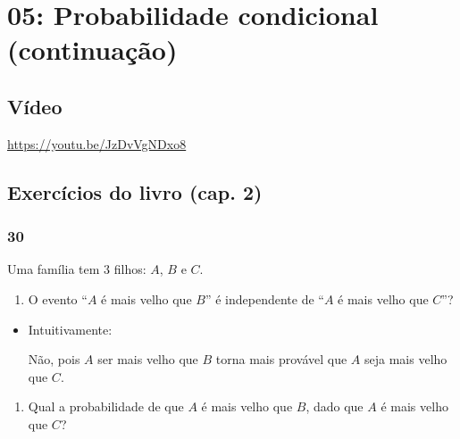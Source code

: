 \documentclass[
  11pt]{report}
\providecommand{\tightlist}{%
  \setlength{\itemsep}{0pt}\setlength{\parskip}{0pt}}
\begin{document}
\hypertarget{probabilidade-condicional-continuauxe7uxe3o}{%
\chapter*{05: Probabilidade condicional (continuação)}\label{probabilidade-condicional-continuauxe7uxe3o}}

\hypertarget{vuxeddeo-4}{%
\section*{Vídeo}\label{vuxeddeo-4}}

\begin{center} \url{https://youtu.be/JzDvVgNDxo8} \end{center}

\hypertarget{exercuxedcios-do-livro-cap.-2-1}{%
\section*{Exercícios do livro (cap. 2)}\label{exercuxedcios-do-livro-cap.-2-1}}

\hypertarget{section-17}{%
\subsection*{30}\label{section-17}}

\begin{rmdbox}

Uma família tem $3$ filhos: $A$, $B$ e $C$.

\begin{enumerate}
\def\labelenumi{\alph{enumi}.}
\tightlist
\item
  O evento ``$A$ é mais velho que $B$'' é independente de ``$A$ é mais velho que $C$''?
\end{enumerate}

\end{rmdbox}

\begin{itemize}
\item
  Intuitivamente:

  Não, pois $A$ ser mais velho que $B$ torna mais provável que $A$ seja mais velho que $C$.
\end{itemize}

\begin{rmdbox}

\begin{enumerate}
\def\labelenumi{\alph{enumi}.}
\setcounter{enumi}{1}
\tightlist
\item
  Qual a probabilidade de que $A$ é mais velho que $B$, dado que $A$ é mais velho que $C$?
\end{enumerate}

\end{rmdbox}
\end{document}

